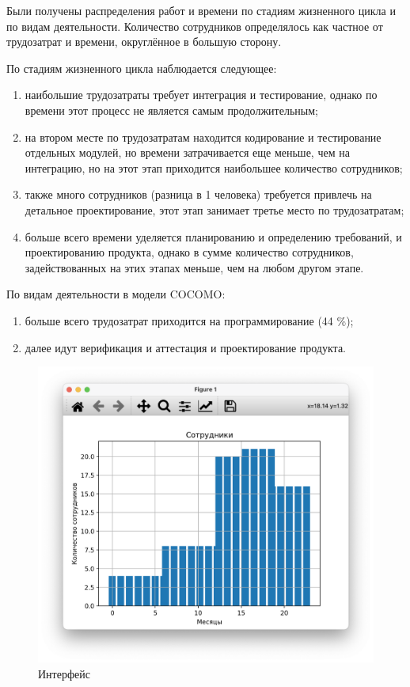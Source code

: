 Были получены распределения работ и времени по стадиям жизненного цикла и по видам деятельности. Количество сотрудников определялось как частное от трудозатрат и времени, округлённое в большую сторону.

По стадиям жизненного цикла наблюдается следующее:

\begin{enumerate}
	\item наибольшие трудозатраты требует интеграция и тестирование, однако по времени этот процесс не является самым продолжительным;
	\item на втором месте по трудозатратам находится кодирование и тестирование отдельных модулей, но времени затрачивается еще меньше, чем на интеграцию, но на этот этап приходится наибольшее количество сотрудников;
	\item также много сотрудников (разница в 1 человека) требуется привлечь на детальное проектирование, этот этап занимает третье место по трудозатратам;
	\item больше всего времени уделяется планированию и определению требований, и проектированию продукта, однако в сумме количество сотрудников, задействованных на этих этапах меньше, чем на любом другом этапе.
\end{enumerate}

По видам деятельности в модели COCOMO:

\begin{enumerate}
	\item больше всего трудозатрат приходится на программирование (44 \%);
	\item далее идут верификация и аттестация и проектирование продукта.
\end{enumerate}

\begin{figure}[ht!]
	\includegraphics[width=0.6\linewidth]{assets/images/3.3 Сотрудники.png}
	\caption{Интерфейс}
\end{figure}
\FloatBarrier

